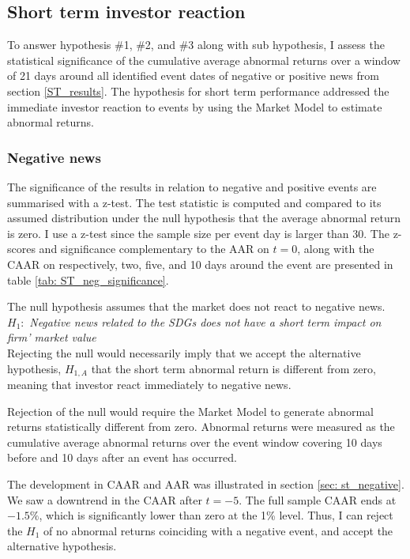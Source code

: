
\subsection{Short term investor reaction} 
To answer hypothesis \#1, \#2, and \#3 along with sub hypothesis, I assess the statistical significance of the cumulative average abnormal returns over a window of 21 days around all identified event dates of negative or positive news from section \ref{ST_results}. The hypothesis for short term performance addressed the immediate investor reaction to events by using the Market Model to estimate abnormal returns. 

\subsubsection{Negative news }


The significance of the results in relation to negative and positive events are summarised with a z-test. The test statistic is computed and compared to its assumed distribution under the null hypothesis that the average abnormal return is zero. I use a z-test since the sample size per event day is larger than 30. The z-scores and significance complementary to the AAR on $t=0$, along with the CAAR on respectively, two, five, and 10 days around the event are presented in table \ref{tab: ST_neg_significance}.   

The null hypothesis assumes that the market does not react to negative news. \\ 
$H_1:$ \textit{Negative news related to the SDGs does not have a short term impact on firm' market value} \\
Rejecting the null would necessarily imply that we accept the alternative hypothesis, $H_{1,A}$ that the short term abnormal return is different from zero, meaning that investor react immediately to negative news. 

Rejection of the null would require the Market Model to generate abnormal returns statistically different from zero. Abnormal returns were measured as the cumulative average abnormal returns over the event window covering 10 days before and 10 days after an event has occurred. 

The development in CAAR and AAR was illustrated in section \ref{sec: st_negative}. We saw a downtrend in the CAAR after $t = -5$. The full sample CAAR ends at $-1.5\%$, which is significantly lower than zero at the 1\% level. Thus, I can reject the $H_1$ of no abnormal returns coinciding with a negative event, and accept the alternative hypothesis. 

